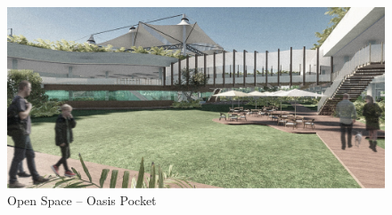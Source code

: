 ﻿%
\begin{figure}[H]
	\centering
	\includegraphics[width=\linewidth]{src/graphics/kalideres-integrated-bus-terminal--perspective-oasis-void-pocket.jpg}
	\caption*{%
		Open Space -- Oasis Pocket
	}
	\label{
		fig:kalideres-integrated-bus-terminal--perspective-oasis-void-pocket
	}
\end{figure}
